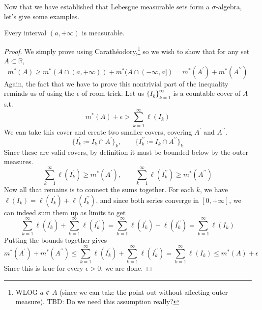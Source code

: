   Now that we have established that Lebesgue measurable sets form a $\sigma$-algebra, let's give some examples. 

  \begin{theorem}
    Every interval $(a, +\infty)$ is measurable. 
  \end{theorem}
  \begin{proof}
    We simply prove using Carathéodory,\footnote{WLOG $a \not\in A$ (since we can take the point out without affecting outer measure). TBD: Do we need this assumption really?} so we wish to show that for any set $A \subset \mathbb{R}$, 
    \begin{equation}
      m^\ast (A) \geq m^\ast (A \cap (a, +\infty)) + m^\ast(A \cap (-\infty, a]) = m^\ast (A^\prime) + m^\ast(A^{\prime\prime})
    \end{equation}
    Again, the fact that we have to prove this nontrivial part of the inequality reminds us of using the $\epsilon$ of room trick. Let us 
    $\{I_k\}_{k=1}^\infty$ is a countable cover of $A$ s.t. 
    \begin{equation}
      m^\ast (A) + \epsilon > \sum_{k=1}^\infty \ell (I_k)
    \end{equation}
    We can take this cover and create two smaller covers, covering $A^\prime$ and $A^{\prime\prime}$. 
    \begin{equation}
      \{I_k^\prime \coloneqq I_k \cap A^\prime\}_k, \qquad \{I_k^{\prime\prime} \coloneqq I_k \cap A^{\prime\prime}\}_k
    \end{equation}
    Since these are valid covers, by definition it must be bounded below by the outer measures. 
    \begin{equation}
      \sum_{k=1}^\infty \ell(I_k^\prime) \geq m^\ast(A^\prime), \qquad \sum_{k=1}^\infty \ell(I_k^{\prime\prime}) \geq m^\ast(A^{\prime\prime})
    \end{equation}
    Now all that remains is to connect the sums together. For each $k$, we have $\ell(I_k) = \ell(I_k^\prime) + \ell(I_k^{\prime\prime})$, and since both series converge in $[0, +\infty]$, we can indeed sum them up as limits to get 
    \begin{equation}
      \sum_{k=1}^\infty \ell(I_k^\prime) + \sum_{k=1}^\infty \ell(I_k^{\prime\prime}) = \sum_{k=1}^\infty \ell(I_k^\prime) + \ell(I_k^{\prime\prime}) = \sum_{k=1}^\infty \ell(I_k) 
    \end{equation}
    Putting the bounds together gives 
    \begin{equation}
      m^\ast (A^\prime) + m^\ast (A^{\prime\prime}) \leq \sum_{k=1}^\infty \ell(I_k^\prime) + \sum_{k=1}^\infty \ell(I_k^{\prime\prime}) = \sum_{k=1}^\infty \ell(I_k)  \leq m^\ast (A) + \epsilon
    \end{equation}
    Since this is true for every $\epsilon > 0$, we are done.  
  \end{proof}


